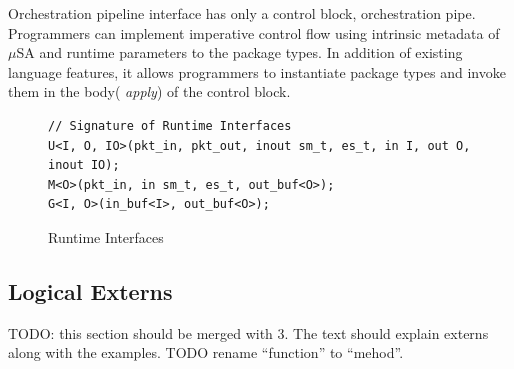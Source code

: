 Orchestration pipeline interface has only a control block, orchestration pipe.
Programmers can implement imperative control flow using intrinsic metadata of $\mu$SA and runtime parameters to the package types.
In addition of existing language features, it allows programmers to instantiate package types and invoke them in the body( \emph{apply}) of the control block.

\begin{figure}[!h]
\begin{lstlisting}[frame=none]
// Signature of Runtime Interfaces
U<I, O, IO>(pkt_in, pkt_out, inout sm_t, es_t, in I, out O, inout IO); 
M<O>(pkt_in, in sm_t, es_t, out_buf<O>); 
G<I, O>(in_buf<I>, out_buf<O>); 
\end{lstlisting}
\caption{Runtime Interfaces}
\label{fig:interfaces}
\end{figure}

% 
% 
% 


\subsection{Logical Externs}
\label{subsection:logical-externs}
TODO: this section should be merged with 3. The text should explain externs along with the examples.
TODO rename ``function'' to ``mehod''.
